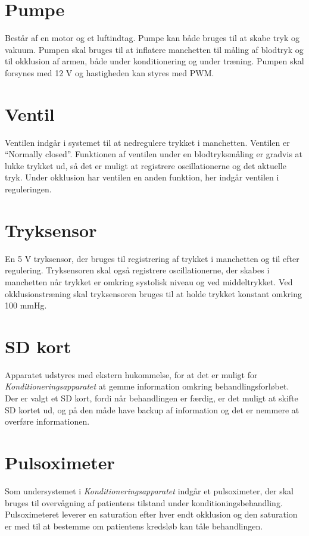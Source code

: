 \section{Pumpe}
Består af en motor og et luftindtag. Pumpe kan både bruges til at skabe tryk og vakuum. Pumpen skal bruges til at inflatere manchetten til måling af blodtryk og til okklusion af armen, både under konditionering og under træning. Pumpen skal forsynes med 12 V og hastigheden kan styres med PWM. 

\section{Ventil}
Ventilen indgår i systemet til at nedregulere trykket i manchetten. Ventilen er “Normally closed”. Funktionen af ventilen under en blodtryksmåling er gradvis at lukke trykket ud, så det er muligt at registrere oscillationerne og det aktuelle tryk. Under okklusion har ventilen en anden funktion, her indgår ventilen i reguleringen.

\section{Tryksensor}
En 5 V tryksensor, der bruges til registrering af trykket i manchetten og til efter regulering. Tryksensoren skal også registrere oscillationerne, der skabes i manchetten når trykket er omkring systolisk niveau og ved middeltrykket. Ved okklusionstræning skal tryksensoren bruges til at holde trykket konstant omkring 100 mmHg.

\section{SD kort}
Apparatet udstyres med ekstern hukommelse, for at det er muligt for \textit{Konditioneringsapparatet} at gemme information omkring behandlingsforløbet. Der er valgt et SD kort, fordi når behandlingen er færdig, er det muligt at skifte SD kortet ud, og på den måde have backup af information og det er nemmere at overføre informationen. 

\section{Pulsoximeter}
Som undersystemet i \textit{Konditioneringsapparatet} indgår et pulsoximeter, der skal bruges til overvågning af patientens tilstand under konditioningsbehandling. Pulsoximeteret leverer en saturation efter hver endt okklusion og den saturation er med til at bestemme om patientens kredsløb kan tåle behandlingen.